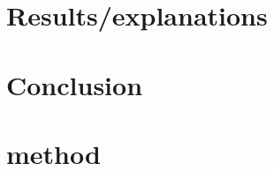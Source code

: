\documentclass[10pt,a4paper]{article}
\begin{document}




\section{Results/explanations}

\section{Conclusion}












\section{method}

\printbibliography
\end{document}
